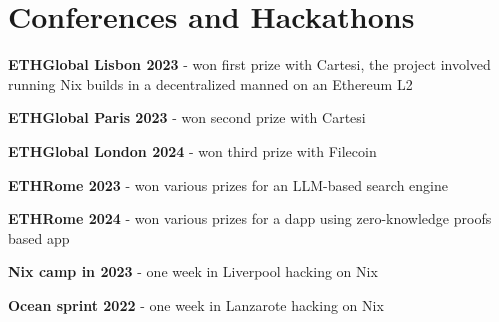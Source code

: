 \documentclass[]{cv}
\begin{document}
\begin{minipage}[t]{0.75\textwidth}
\section{Conferences and Hackathons}
\vspace{+0.5em}
\begin{tightemize}
\item \textbf{ETHGlobal Lisbon 2023} - won first prize with Cartesi, the project involved running Nix builds in a decentralized manned on an Ethereum L2
\item \textbf{ETHGlobal Paris 2023} - won second prize with Cartesi
\item \textbf{ETHGlobal London 2024} - won third prize with Filecoin
\item \textbf{ETHRome 2023} - won various prizes for an LLM-based search engine
\item \textbf{ETHRome 2024} - won various prizes for a dapp using zero-knowledge proofs based app
\item \textbf{Nix camp in 2023} - one week in Liverpool hacking on Nix
\item \textbf{Ocean sprint 2022} - one week in Lanzarote hacking on Nix
\end{tightemize}
\sectionsep

\end{minipage}
\hfill
\end{document}
